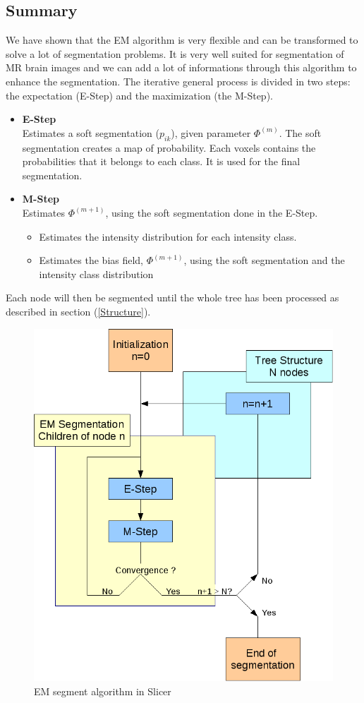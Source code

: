 \subsection{Summary}\label{SUMMARY}
We have shown that the EM algorithm is very flexible and can be transformed to solve a lot of segmentation problems. It is very well suited for segmentation of MR brain images and we can add a lot of informations through this algorithm to enhance the segmentation. The iterative general process is divided in two steps: the expectation (E-Step) and the maximization (the M-Step).

  \begin{itemize}
  \item \textbf{E-Step}\\  
  Estimates a soft segmentation ($p_{ik}$), given parameter $\Phi^{(m)}$. The soft segmentation creates a map of probability. Each voxels contains the probabilities that it belongs to each class. It is used for the final segmentation.
  
  \item \textbf{M-Step}\\
  Estimates $\Phi^{(m+1)}$, using the soft segmentation done in the E-Step.
  
    \begin{itemize}
    \item Estimates the intensity distribution for each intensity class.    
    \item Estimates the bias field, $\Phi^{(m+1)}$, using the soft segmentation and the intensity class distribution
    \end{itemize}
  \end{itemize}
  
Each node will then be segmented until the whole tree has been processed as described in section (\ref{Structure}).

  \begin{figure}[ht]\centering
  \includegraphics[width=.8\textwidth]{Images/Graphics/workflowtheorical.png}
  \caption{EM segment algorithm in Slicer}\label{fig:EMSSlicer}
  \end{figure}
  
